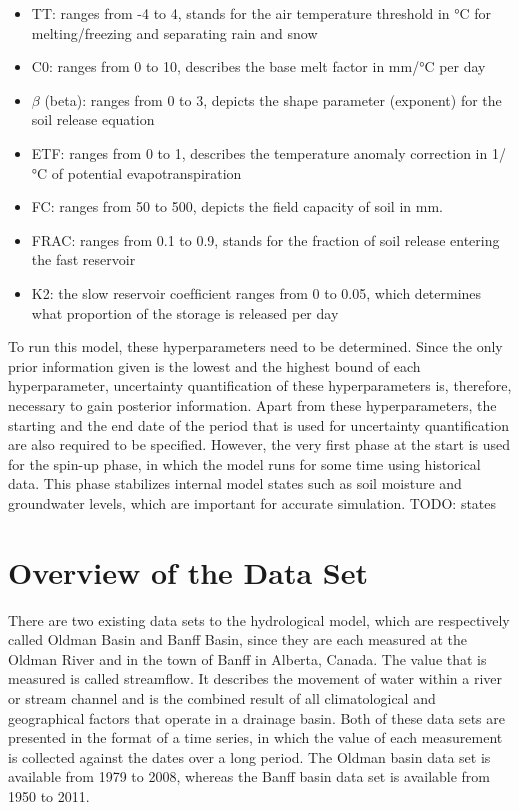 \begin{itemize}
  \item TT: ranges from -4 to 4, stands for the air temperature threshold in °C for melting/freezing and separating rain and snow
  \item C0: ranges from 0 to 10, describes the base melt factor in mm/°C per day
  \item $\beta$ (beta): ranges from 0 to 3, depicts the shape parameter (exponent) for the soil release equation
  \item ETF: ranges from 0 to 1, describes the temperature anomaly correction in 1/°C of potential evapotranspiration
  \item FC: ranges from 50 to 500, depicts the field capacity of soil in mm.
  \item FRAC: ranges from 0.1 to 0.9, stands for the fraction of soil release entering the fast reservoir
  \item K2: the slow reservoir coefﬁcient ranges from 0 to 0.05, which determines what proportion of the storage is released per day
\end{itemize}

To run this model, these hyperparameters need to be determined. Since the only prior information given is the lowest and the highest bound of each hyperparameter, uncertainty quantification of these hyperparameters is, therefore, necessary to gain posterior information. Apart from these hyperparameters, the starting and the end date of the period that is used for uncertainty quantification are also required to be specified.\cite{hydrology} However, the very first phase at the start is used for the spin-up phase, in which the model runs for some time using historical data. This phase stabilizes internal model states such as soil moisture and groundwater levels, which are important for accurate simulation.\cite{hydrology}
TODO: states

\section{Overview of the Data Set}
There are two existing data sets to the hydrological model, which are respectively called Oldman Basin and Banff Basin, since they are each measured at the Oldman River and in the town of Banff in Alberta, Canada.\cite{hydrology_dataset} The value that is measured is called streamflow. It describes the movement of water within a river or stream channel and is the combined result of all climatological and geographical factors that operate in a drainage basin.\cite{streamflow} Both of these data sets are presented in the format of a time series, in which the value of each measurement is collected against the dates over a long period. The Oldman basin data set is available from 1979 to 2008, whereas the Banff basin data set is available from 1950 to 2011.\cite{hydrology}


